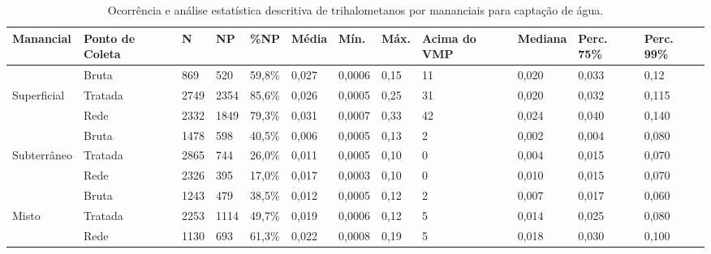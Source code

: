 \begin{table}[!htb]
\begin{flushleft}
\small
\caption{Ocorrência e análise estatística descritiva de trihalometanos por mananciais para captação de água. } 
\begin{tabular}{p{1.6cm}p{1.2cm}p{0.6cm}p{0.6cm}p{0.8cm}p{1cm}p{1cm}p{0.8cm}p{1cm}p{1.2cm}p{0.7cm}p{0.9cm}}
\toprule
 \textbf{Manancial} & \textbf{Ponto de Coleta} & \textbf{N} & \textbf{NP} & \textbf{\%NP} & \textbf{Média} & \textbf{Mín.} & \textbf{Máx.} & \textbf{Acima do VMP} & \textbf{Mediana} & \textbf{Perc. 75\%} & \textbf{Perc. 99\%}  \\
\midrule
& Bruta & 869 & 520 & 59,8\%& 0,027 & 0,0006 & 0,15 &11 & 0,020 & 0,033 & 0,12\\
Superficial & Tratada & 2749 & 2354 & 85,6\% & 0,026& 0,0005&0,25 & 31 & 0,020 & 0,032 & 0,115\\
& Rede & 2332 & 1849 & 79,3\% &0,031 & 0,0007&0,33 & 42 & 0,024 & 0,040 & 0,140\\
\hline
& Bruta & 1478 & 598 & 40,5\% &0,006 & 0,0005 &0,13 & 2 & 0,002 & 0,004 & 0,080\\ 
Subterrâneo & Tratada & 2865 & 744 & 26,0\% & 0,011 & 0,0005 & 0,10 & 0 & 0,004 & 0,015 & 0,070\\
& Rede & 2326 & 395 & 17,0\% & 0,017 & 0,0003& 0,10 & 0 & 0,010 & 0,015 & 0,070\\\hline
& Bruta & 1243 & 479 & 38,5\% & 0,012& 0,0005&0,12 & 2 & 0,007 & 0,017 & 0,060\\ 
Misto & Tratada & 2253 & 1114 & 49,7\% & 0,019 & 0,0006 &0,12 & 5 & 0,014 & 0,025 & 0,080\\
& Rede & 1130 & 693 & 61,3\% & 0,022& 0,0008& 0,19 & 5 & 0,018 & 0,030 & 0,100\\
\bottomrule
\end{tabular}
    \end{flushleft}
\end{table}



